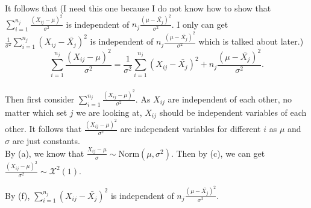 \documentclass{article}
\begin{document}
It follows that (I need this one because I do not know how to show that $\sum_{i=1}^{n_j} \frac{(X_{ij}-\mu)^2}{\sigma^2}$ is independent of $n_j\frac{(\mu -\bar{X_j})^2}{\sigma^2}$. I only can get $ \frac{1}{\sigma^2} \sum_{i=1}^{n_j} (X_{ij}-\bar{X_j})^2$ is independent of $n_j\frac{(\mu -\bar{X_j})^2}{\sigma^2}$ which is talked about later.) $$ \sum_{i=1}^{n_j} \frac{(X_{ij}-\mu)^2}{\sigma^2} = \frac{1}{\sigma^2} \sum_{i=1}^{n_j} (X_{ij}-\bar{X_j})^2+n_j\frac{(\mu -\bar{X_j})^2}{\sigma^2}.$$\\

Then first consider $\sum_{i=1}^{n_j} \frac{(X_{ij}-\mu)^2}{\sigma^2}$. As $X_{ij}$ are independent of each other, no matter which set $j$ we are looking at, $X_{ij}$ should be independent variables of each other. It follows that $\frac{(X_{ij}-\mu)^2}{\sigma^2}$ are independent variables for different $i$ as $\mu$ and $\sigma$ are just constants.\\

By (a), we know that $\frac{X_{ij}-\mu}{\sigma} \sim \text{Norm}(\mu,\sigma^2)$. Then by (c), we can get $\frac{(X_{ij}-\mu)^2}{\sigma^2} \sim \mathcal{X}^2(1)$. 



By (f), $\sum_{i=1}^{n_j} (X_{ij}-\bar{X_j})^2$ is independent of $n_j\frac{(\mu -\bar{X_j})^2}{\sigma^2}$. 
\end{document}
